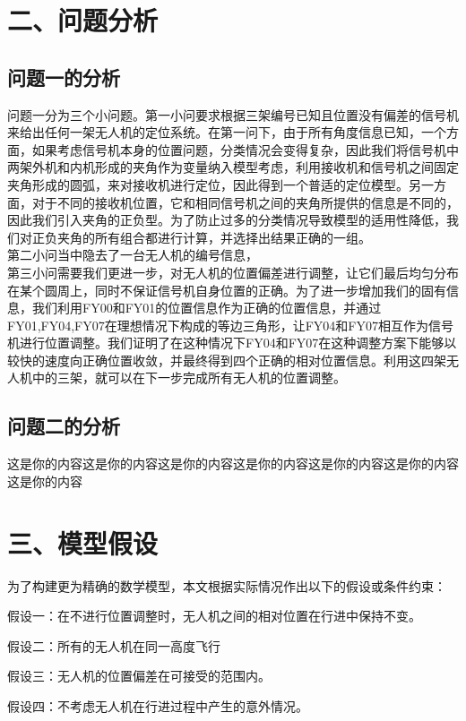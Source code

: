 \documentclass{my_paper}
\begin{document}
\section{二、问题分析}
\subsection{问题一的分析}
问题一分为三个小问题。第一小问要求根据三架编号已知且位置没有偏差的信号机来给出任何一架无人机的定位系统。在第一问下，由于所有角度信息已知，一个方面，如果考虑信号机本身的位置问题，分类情况会变得复杂，因此我们将信号机中两架外机和内机形成的夹角作为变量纳入模型考虑，利用接收机和信号机之间固定夹角形成的圆弧，来对接收机进行定位，因此得到一个普适的定位模型。另一方面，对于不同的接收机位置，它和相同信号机之间的夹角所提供的信息是不同的，因此我们引入夹角的正负型。为了防止过多的分类情况导致模型的适用性降低，我们对正负夹角的所有组合都进行计算，并选择出结果正确的一组。\\

第二小问当中隐去了一台无人机的编号信息，\\

第三小问需要我们更进一步，对无人机的位置偏差进行调整，让它们最后均匀分布在某个圆周上，同时不保证信号机自身位置的正确。为了进一步增加我们的固有信息，我们利用FY00和FY01的位置信息作为正确的位置信息，并通过FY01,FY04,FY07在理想情况下构成的等边三角形，让FY04和FY07相互作为信号机进行位置调整。我们证明了在这种情况下FY04和FY07在这种调整方案下能够以较快的速度向正确位置收敛，并最终得到四个正确的相对位置信息。利用这四架无人机中的三架，就可以在下一步完成所有无人机的位置调整。
\subsection{问题二的分析}
这是你的内容这是你的内容这是你的内容这是你的内容这是你的内容这是你的内容这是你的内容
\section{三、模型假设}
为了构建更为精确的数学模型，本文根据实际情况作出以下的假设或条件约束：

假设一：在不进行位置调整时，无人机之间的相对位置在行进中保持不变。

假设二：所有的无人机在同一高度飞行

假设三：无人机的位置偏差在可接受的范围内。

假设四：不考虑无人机在行进过程中产生的意外情况。
\end{document}
